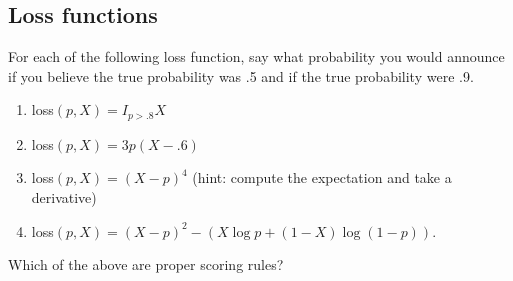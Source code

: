 \documentclass[12pt]{extarticle}
\begin{document}
\subsection{Loss functions}
 For each of the following loss function, say what probability
you would announce if you believe the true probability was .5 and
if the true probability were .9.
\begin{enumerate}
\item loss$(p,X) = I_{p>.8}X$
\item loss$(p,X) = 3p(X -.6)$
\item loss$(p,X) = (X - p)^4$ (hint: compute the expectation and take
a derivative)
\item loss$(p,X) = (X - p)^2 - \left(X \log p + (1-X) \log(1-p)\right)$.
\end{enumerate}
Which of the above are proper scoring rules?
\end{document}
